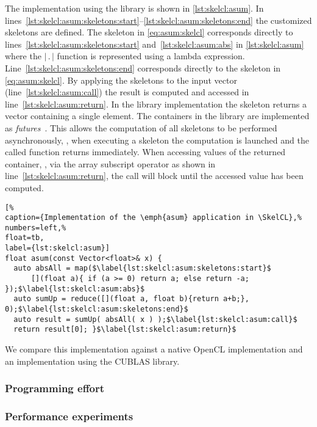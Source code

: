 The implementation using the \SkelCL library is shown in \autoref{lst:skelcl:asum}.
In lines~\ref{lst:skelcl:asum:skeletons:start}--\ref{lst:skelcl:asum:skeletons:end} the customized skeletons are defined.
The \map skeleton in \autoref{eq:asum:skelcl} corresponds directly to lines~\ref{lst:skelcl:asum:skeletons:start} and~\ref{lst:skelcl:asum:abs} in \autoref{lst:skelcl:asum} where the $|\, .\, |$ function is represented using a \Cpp lambda expression.
Line~\ref{lst:skelcl:asum:skeletons:end} corresponds directly to the \reduce skeleton in \autoref{eq:asum:skelcl}.
By applying the skeletons to the input vector (line~\ref{lst:skelcl:asum:call}) the result is computed and accessed in line~\ref{lst:skelcl:asum:return}.
In the \SkelCL library implementation the \reduce skeleton returns a vector containing a single element.
The containers in the \SkelCL library are implemented as \emph{futures}~\cite{HewittBa1977,FriedmanWi1978}.
This allows the computation of all skeletons to be performed asynchronously, \ie, when executing a skeleton the computation is launched and the called function returns immediately.
When accessing values of the returned container, \eg, via the array subscript operator as shown in line~\ref{lst:skelcl:asum:return}, the call will block until the accessed value has been computed.

\begin{lstlisting}[%                                                             
caption={Implementation of the \emph{asum} application in \SkelCL},%
numbers=left,%
float=tb,
label={lst:skelcl:asum}]
float asum(const Vector<float>& x) {
  auto absAll = map($\label{lst:skelcl:asum:skeletons:start}$
      [](float a){ if (a >= 0) return a; else return -a; });$\label{lst:skelcl:asum:abs}$
  auto sumUp = reduce([](float a, float b){return a+b;}, 0);$\label{lst:skelcl:asum:skeletons:end}$
  auto result = sumUp( absAll( x ) );$\label{lst:skelcl:asum:call}$
  return result[0]; }$\label{lst:skelcl:asum:return}$
\end{lstlisting}

We compare this implementation against a native OpenCL implementation and an implementation using the CUBLAS library.

\subsubsection*{Programming effort}

\subsubsection*{Performance experiments}

